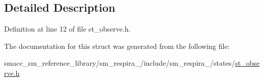 \subsection{Detailed Description}


Definition at line 12 of file st\+\_\+observe.\+h.



The documentation for this struct was generated from the following file\+:\begin{DoxyCompactItemize}
\item 
smacc\+\_\+sm\+\_\+reference\+\_\+library/sm\+\_\+respira\+\_/include/sm\+\_\+respira\+\_/states/\hyperlink{sm__respira__1_2include_2sm__respira__1_2states_2st__observe_8h}{st\+\_\+observe.\+h}\end{DoxyCompactItemize}
